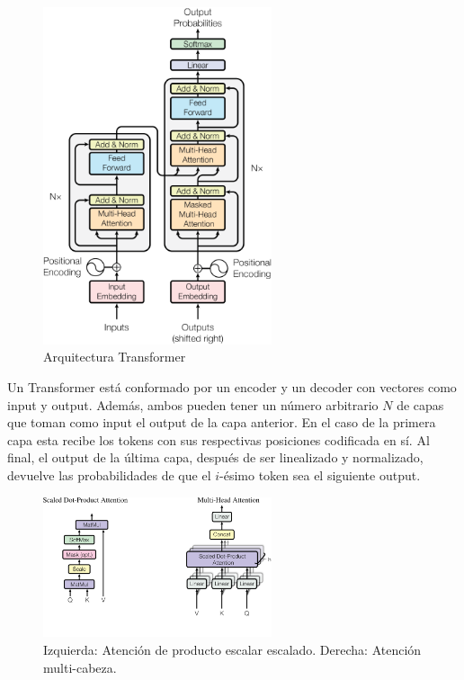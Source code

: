\documentclass[../main.tex]{subfiles}
\begin{document}
\begin{figure}[H]
	\centering
	\includegraphics[width=0.6\textwidth]{images/g920.png}
	\caption{Arquitectura Transformer\cite{vaswani2017attention}}
\end{figure}

Un Transformer está conformado por un encoder y un decoder con vectores como input y output.
Además, ambos pueden tener un número arbitrario $N$ de capas que toman como input el output de la capa anterior.
En el caso de la primera capa esta recibe los tokens con sus respectivas posiciones codificada en sí.
Al final, el output de la última capa, después de ser linealizado y normalizado,
devuelve las probabilidades de que el $i$-ésimo token sea el siguiente output.

\begin{figure}[H]
	\centering
	\includegraphics[width=0.6\textwidth]{images/g6211.png}
	\caption{Izquierda: Atención de producto escalar escalado. Derecha: Atención multi-cabeza.\cite{vaswani2017attention}}
\end{figure}
\end{document}
